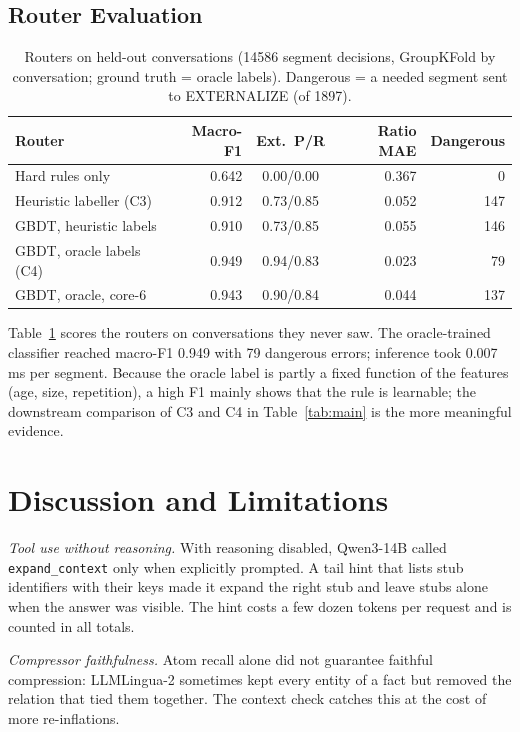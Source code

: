 \documentclass[journal]{IEEEtran}
\begin{document}
\subsection{Router Evaluation}
\begin{table}[t]\centering\caption{Routers on held-out conversations (14586 segment decisions, GroupKFold by conversation; ground
truth = oracle labels). Dangerous = a needed segment sent to EXTERNALIZE (of 1897).}\label{tab:clf}\footnotesize\setlength{\tabcolsep}{3pt}
\begin{tabular}{lrcrr}\toprule Router & Macro-F1 & Ext.\ P/R & Ratio MAE & Dangerous\\\midrule
Hard rules only & 0.642 & 0.00/0.00 & 0.367 & 0 \\
Heuristic labeller (C3) & 0.912 & 0.73/0.85 & 0.052 & 147 \\
GBDT, heuristic labels & 0.910 & 0.73/0.85 & 0.055 & 146 \\
GBDT, oracle labels (C4) & 0.949 & 0.94/0.83 & 0.023 & 79 \\
GBDT, oracle, core-6 & 0.943 & 0.90/0.84 & 0.044 & 137 \\
\bottomrule\end{tabular}\end{table}
Table~\ref{tab:clf} scores the routers on conversations they never saw. The oracle-trained classifier reached macro-F1 0.949
with 79 dangerous errors; inference took 0.007\,ms per segment. Because the oracle label is
partly a fixed function of the features (age, size, repetition), a high F1 mainly shows that the rule is learnable; the downstream comparison of
C3 and C4 in Table~\ref{tab:main} is the more meaningful evidence.


\section{Discussion and Limitations}\label{sec:disc}
\textit{Tool use without reasoning.} With reasoning disabled, Qwen3-14B called \texttt{expand\_context} only when explicitly prompted. A tail hint
that lists stub identifiers with their keys made it expand the right stub and leave stubs alone when the answer was visible. The hint costs a few
dozen tokens per request and is counted in all totals.

\textit{Compressor faithfulness.} Atom recall alone did not guarantee faithful compression: LLMLingua-2 sometimes kept every entity of a fact but
removed the relation that tied them together. The context check catches this at the cost of more re-inflations.
\end{document}
